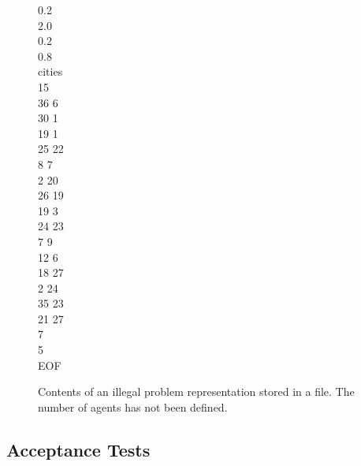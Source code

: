 \begin{figure}[H]
0.2 \\
2.0 \\
0.2 \\
0.8 \\
cities \\
15 \\
36 6 \\
30 1 \\
19 1 \\
25 22 \\
8 7 \\
2 20 \\
26 19 \\
19 3 \\
24 23 \\
7 9 \\
12 6 \\
18 27 \\
2 24 \\
35 23 \\
21 27 \\
7 \\
5 \\
EOF
\caption[Illegal File contents - Missing Data]{Contents of an illegal problem representation stored in a file. The number of agents has not been defined.}
\label{invalidConfigMissing}
\end{figure}

\subsection{Acceptance Tests}
\label{AcceptanceTestz}

